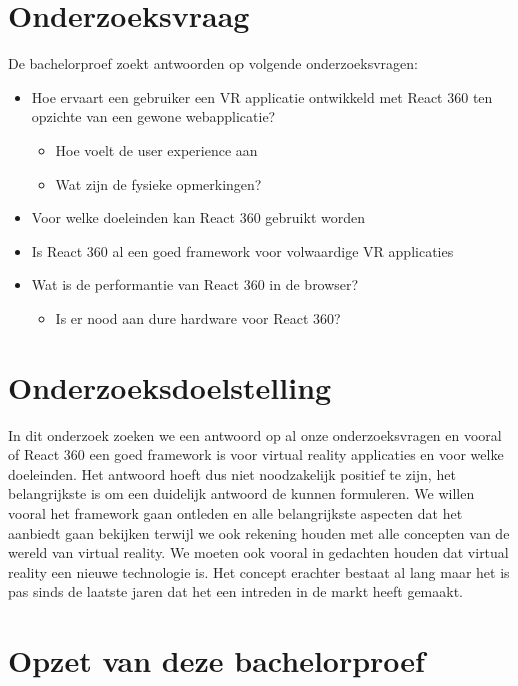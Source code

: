\section{Onderzoeksvraag}
\label{sec:onderzoeksvraag}

De bachelorproef zoekt antwoorden op volgende onderzoeksvragen:
\begin{itemize}
  \item	Hoe ervaart een gebruiker een VR applicatie ontwikkeld met React 360 ten opzichte van een gewone webapplicatie?
  \begin{itemize}
  \item	Hoe voelt de user experience aan
  \item	Wat zijn de fysieke opmerkingen?
  \end{itemize}
  \item	Voor welke doeleinden kan React 360 gebruikt worden
  \item	Is React 360 al een goed framework voor volwaardige VR applicaties
  \item	Wat is de performantie van React 360 in de browser?
  \begin{itemize}
  \item Is er nood aan dure hardware voor React 360?
  \end{itemize}
\end{itemize}



\section{Onderzoeksdoelstelling}
\label{sec:onderzoeksdoelstelling}

In dit onderzoek zoeken we een antwoord op al onze onderzoeksvragen en vooral of React 360 een goed framework is voor virtual reality applicaties en voor welke doeleinden. Het antwoord hoeft dus niet noodzakelijk positief te zijn, het belangrijkste is om een duidelijk antwoord de kunnen formuleren. We willen vooral het framework gaan ontleden en alle belangrijkste aspecten dat het aanbiedt gaan bekijken terwijl we ook rekening houden met alle concepten van de wereld van virtual reality. We moeten ook vooral in gedachten houden dat virtual reality een nieuwe technologie is. Het concept erachter bestaat al lang maar het is pas sinds de laatste jaren dat het een intreden in de markt heeft gemaakt.

\section{Opzet van deze bachelorproef}
\label{sec:opzet-bachelorproef}

